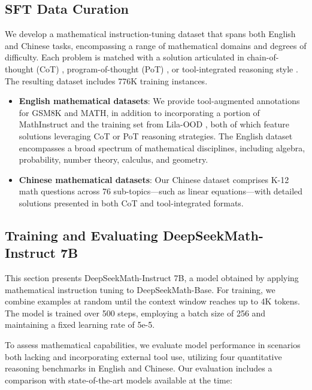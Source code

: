 \begin{itemize}[topsep=0pt]
\subsection{SFT Data Curation}

We develop a mathematical instruction-tuning dataset that spans both English and Chinese tasks, encompassing a range of mathematical domains and degrees of difficulty. Each problem is matched with a solution articulated in chain-of-thought (CoT) \citep{cot}, program-of-thought (PoT) \citep{pot,pal}, or tool-integrated reasoning style \citep{tora}. The resulting dataset includes 776K training instances.

\begin{itemize}[topsep=0pt]
    \item \textbf{English mathematical datasets}: We provide tool-augmented annotations for GSM8K and MATH, in addition to incorporating a portion of MathInstruct \citep{MathInstruct} and the training set from Lila-OOD \citep{lila}, both of which feature solutions leveraging CoT or PoT reasoning strategies. The English dataset encompasses a broad spectrum of mathematical disciplines, including algebra, probability, number theory, calculus, and geometry.
    \item \textbf{Chinese mathematical datasets}: Our Chinese dataset comprises K-12 math questions across 76 sub-topics—such as linear equations—with detailed solutions presented in both CoT and tool-integrated formats.
\end{itemize}

\subsection{Training and Evaluating DeepSeekMath-Instruct 7B}

This section presents DeepSeekMath-Instruct 7B, a model obtained by applying mathematical instruction tuning to DeepSeekMath-Base. For training, we combine examples at random until the context window reaches up to 4K tokens. The model is trained over 500 steps, employing a batch size of 256 and maintaining a fixed learning rate of 5e-5.

To assess mathematical capabilities, we evaluate model performance in scenarios both lacking and incorporating external tool use, utilizing four quantitative reasoning benchmarks in English and Chinese. Our evaluation includes a comparison with state-of-the-art models available at the time:


\end{itemize}
